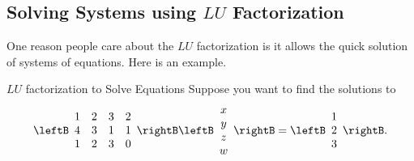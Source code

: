 \subsection{Solving Systems using $LU$ Factorization}

One reason people care about the $LU$ factorization
 is it allows the quick solution of
systems of equations. Here is an example.

\begin{example}{$LU$ factorization to Solve Equations}
Suppose you want to find the solutions to
\begin{equation*}
\leftB
\begin{array}{rrrr}
1 & 2 & 3 & 2 \\
4 & 3 & 1 & 1 \\
1 & 2 & 3 & 0
\end{array}
\rightB \leftB
\begin{array}{c}
x \\
y \\
z \\
w
\end{array}
\rightB =\leftB
\begin{array}{c}
1 \\
2 \\
3
\end{array}
\rightB .
\end{equation*}
\end{example}


